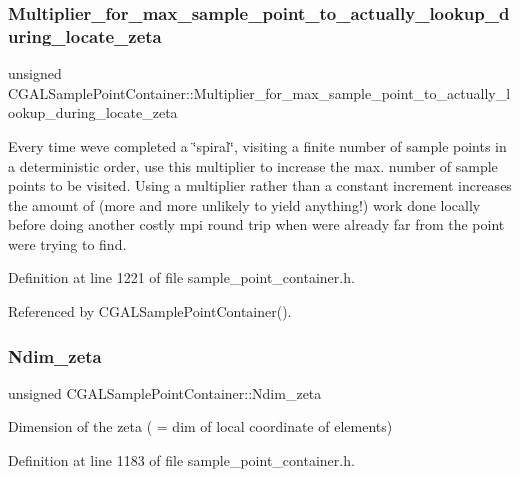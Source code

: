 \subsubsection{\texorpdfstring{Multiplier\+\_\+for\+\_\+max\+\_\+sample\+\_\+point\+\_\+to\+\_\+actually\+\_\+lookup\+\_\+during\+\_\+locate\+\_\+zeta}{Multiplier\_for\_max\_sample\_point\_to\_actually\_lookup\_during\_locate\_zeta}}
{\footnotesize\ttfamily unsigned C\+G\+A\+L\+Sample\+Point\+Container\+::\+Multiplier\+\_\+for\+\_\+max\+\_\+sample\+\_\+point\+\_\+to\+\_\+actually\+\_\+lookup\+\_\+during\+\_\+locate\+\_\+zeta\hspace{0.3cm}{\ttfamily [private]}}



Every time we\textquotesingle{}ve completed a \char`\"{}spiral\char`\"{}, visiting a finite number of sample points in a deterministic order, use this multiplier to increase the max. number of sample points to be visited. Using a multiplier rather than a constant increment increases the amount of (more and more unlikely to yield anything!) work done locally before doing another costly mpi round trip when we\textquotesingle{}re already far from the point we\textquotesingle{}re trying to find. 



Definition at line 1221 of file sample\+\_\+point\+\_\+container.\+h.



Referenced by C\+G\+A\+L\+Sample\+Point\+Container().

\mbox{\label{classCGALSamplePointContainer_abb1a9488b631a288360397b2587f69ea}} 
\subsubsection{\texorpdfstring{Ndim\+\_\+zeta}{Ndim\_zeta}}
{\footnotesize\ttfamily unsigned C\+G\+A\+L\+Sample\+Point\+Container\+::\+Ndim\+\_\+zeta\hspace{0.3cm}{\ttfamily [private]}}



Dimension of the zeta ( = dim of local coordinate of elements) 



Definition at line 1183 of file sample\+\_\+point\+\_\+container.\+h.



